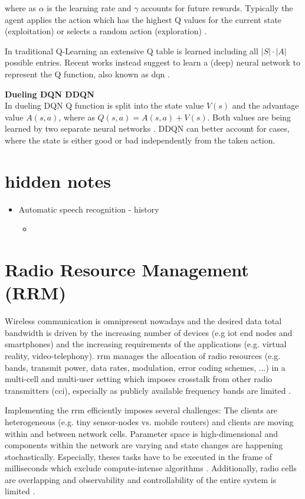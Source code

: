 where as $\alpha$ is the learning rate and $\gamma$ accounts for future rewards. Typically the agent applies the action which has the highest Q values for the current state (exploitation) or selects a random action (exploration) \cite{mnih2015human}. 

In traditional Q-Learning an extensive Q table is learned including all $|S|\cdot|A|$ possible entries. Recent works instead suggest to learn a (deep) neural network to represent the Q function, also known as \gls{dqn} \cite{mnih2015human}.

\textbf{Dueling DQN DDQN}\\
In dueling DQN Q function is split into the state value $V(s)$ and the advantage value $A(s,a)$, where as
$Q(s,a)=A(s,a)+V(s)$. Both values are being learned by two separate neural networks \cite{wang2015dueling}. DDQN can better account for cases, where the state is either good or bad independently from the taken action.

\ifdefined\SHOWNOTES
\fi
\ifdefined\SHOWNOTES
\section{hidden notes}
   \begin{itemize}
    \item \cite{juang2005automatic} Automatic speech recognition - history 
    \begin{itemize}
        \item 
    \end{itemize}
\end{itemize}
\fi

\section{Radio Resource Management (RRM)}
Wireless communication is omnipresent nowadays and the desired data total bandwidth is driven by the increasing number of devices (e.g \gls{iot} end nodes and smartphones) and the increasing requirements of the applications (e.g. virtual reality, video-telephony). \gls{rrm} manages the allocation of radio resources (e.g. bands, transmit power, data rates, modulation, error coding schemes, ...) in a multi-cell and multi-user setting which imposes crosstalk from other radio transmitters (\gls{cci}), especially as publicly available frequency bands are limited \cite{tripathi2006radio}.

Implementing the \gls{rrm} efficiently imposes several challenges: The clients are heterogeneous (e.g. tiny sensor-nodes vs. mobile routers) and clients are moving within and between network cells. Parameter space is high-dimensional and components within the network are varying and state changes are happening stochastically. Especially, theses tasks have to be executed in the frame of milliseconds which exclude compute-intense algorithms \cite{Sun2017}. Additionally, radio cells are overlapping and observability and controllability of the entire system is limited \cite{Ghadimi2017}. 


